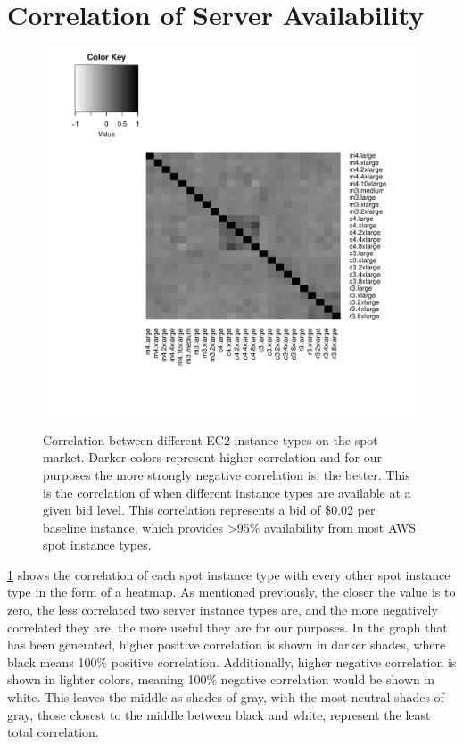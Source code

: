 \documentclass[thesis,proposal]{umassthesis}  %
\begin{document}
\section{Correlation of Server Availability}

\begin{figure}
	\begin{center}
    	\includegraphics{CorrelationHeatMap}
        \caption{Correlation between different EC2 instance types on the spot market. Darker colors represent higher correlation and for our purposes the more strongly negative correlation is, the better. This is the correlation of when different instance types are available at a given bid level. This correlation represents a bid of \$0.02 per baseline instance, which provides >95\% availability from most AWS spot instance types.}\label{fig:corr}
	\end{center}
\end{figure}

\ref{fig:corr} shows the correlation of each spot instance type with every other spot instance type in the form of a heatmap. As mentioned previously, the closer the value is to zero, the less correlated two server instance types are, and the more negatively correlated they are, the more useful they are for our purposes. In the graph that has been generated, higher positive correlation is shown in darker shades, where black means 100\% positive correlation. Additionally, higher negative correlation is shown in lighter colors, meaning 100\% negative correlation would be shown in white. This leaves the middle as shades of gray, with the most neutral shades of gray, those closest to the middle between black and white, represent the least total correlation.\par
\end{document}
